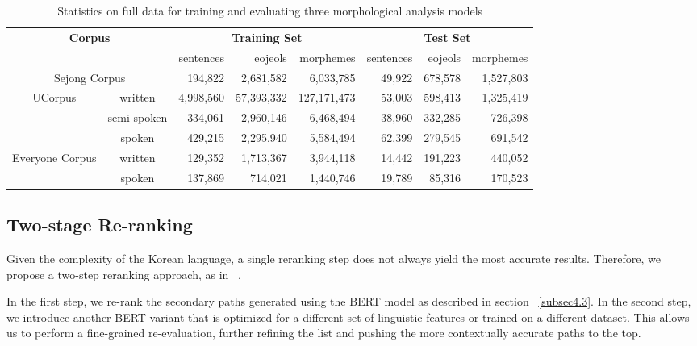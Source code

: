 \documentclass[AMS,STIX2COL]{WileyNJD-v2}
\begin{document}
    \begin{table}[]
        \caption{Statistics on full data for training and evaluating three morphological analysis models}\label{tab:data-statistics}
        \centering
        \begin{tabular*}{500pt}{@{\extracolsep\fill}|c|c|rrr|rrr|@{\extracolsep\fill}}
            \toprule
            \multicolumn{2}{|c|}{\multirow{2}{*}{\textbf{Corpus}}} & \multicolumn{3}{c|}{\textbf{Training Set}} & \multicolumn{3}{c|}{\textbf{Test Set}} \\
            \cmidrule{3-5} \cmidrule{6-8}
            \multicolumn{2}{|c|}{~} & sentences & eojeols & morphemes & sentences & eojeols & morphemes \\
            \midrule
            \multicolumn{2}{|c|}{Sejong Corpus} & 194,822 & 2,681,582 & 6,033,785 & 49,922 & 678,578 & 1,527,803 \\
            \midrule
            \multirow{3}{*}{UCorpus}         & written     & 4,998,560 & 57,393,332 & 127,171,473 & 53,003 & 598,413 & 1,325,419 \\
            ~                                & semi-spoken & 334,061   & 2,960,146  & 6,468,494   & 38,960 & 332,285 & 726,398   \\
            ~                                & spoken      & 429,215   & 2,295,940  & 5,584,494   & 62,399 & 279,545 & 691,542   \\
            \midrule
            \multirow{2}{*}{Everyone Corpus} & written     & 129,352   & 1,713,367  & 3,944,118   & 14,442 & 191,223 & 440,052   \\
            ~                                & spoken      & 137,869   & 714,021    & 1,440,746   & 19,789 & 85,316  & 170,523   \\
            \bottomrule
        \end{tabular*}
    \end{table}

    \subsection{Two-stage Re-ranking}\label{subsec4.4}

    Given the complexity of the Korean language, a single reranking step does not always yield the most accurate results. Therefore, we propose a two-step reranking approach, as in ~\cite{Nogueira2019}.

    In the first step, we re-rank the secondary paths generated using the BERT model as described in section ~\ref{subsec4.3}. In the second step, we introduce another BERT variant that is optimized for a different set of linguistic features or trained on a different dataset. This allows us to perform a fine-grained re-evaluation, further refining the list and pushing the more contextually accurate paths to the top.
\end{document}
